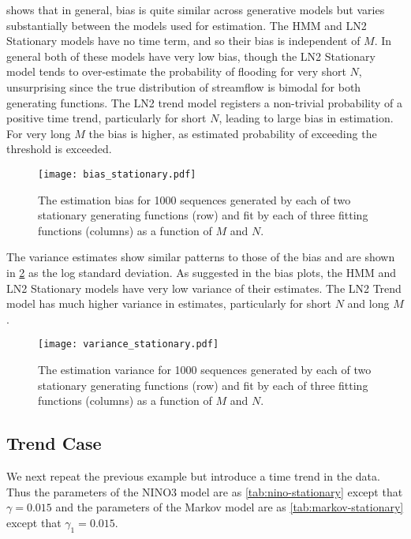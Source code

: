 \documentclass[12pt]{article}
\begin{document}
 shows that in general, bias is quite similar across generative models but varies substantially between the models used for estimation.
The HMM and LN2 Stationary models have no time term, and so their bias is independent of $M$.
In general both of these models have very low bias, though the LN2 Stationary model tends to over-estimate the probability of flooding for very short $N$, unsurprising since the true distribution of streamflow is bimodal for both generating functions. 
The LN2 trend model registers a non-trivial probability of a positive time trend, particularly for short $N$, leading to large bias in estimation.
For very long $M$ the bias is higher, as estimated probability of exceeding the threshold is exceeded.
\begin{figure}[ht]
  \texttt{[image: bias\_stationary.pdf]}
  \caption{The estimation bias for 1000 sequences generated by each of two stationary generating functions (row) and fit by each of three fitting functions (columns) as a function of $M$ and $N$.\label{fig:stationary-bias}}
\end{figure}

The variance estimates show similar patterns to those of the bias and are shown in \cref{fig:stationary-variance} as the log standard deviation.
As suggested in the bias plots, the HMM and LN2 Stationary models have very low variance of their estimates.
The LN2 Trend model has much higher variance in estimates, particularly for short $N$ and long $M$.
\begin{figure}[ht]
  \texttt{[image: variance\_stationary.pdf]}
  \caption{The estimation variance for 1000 sequences generated by each of two stationary generating functions (row) and fit by each of three fitting functions (columns) as a function of $M$ and $N$.\label{fig:stationary-variance}}
\end{figure}

\subsection{Trend Case}

We next repeat the previous example but introduce a time trend in the data.
Thus the parameters of the NINO3 model are as \cref{tab:nino-stationary} except that $\gamma=0.015$ and the parameters of the Markov model are as \cref{tab:markov-stationary} except that $\gamma_1 = 0.015$.
\end{document}
